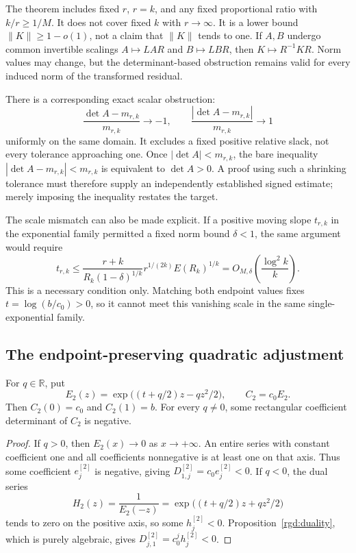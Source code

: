 The theorem includes fixed $r$, $r=k$, and any fixed proportional
ratio with $k/r\ge1/M$.  It does not cover fixed $k$ with $r\to\infty$.
It is a lower bound $\|K\|\ge1-o(1)$, not a claim that $\|K\|$ tends
to one.  If $A,B$ undergo common invertible scalings $A\mapsto LAR$
and $B\mapsto LBR$, then $K\mapsto R^{-1}KR$.  Norm values may change,
but the determinant-based obstruction remains valid for every induced
norm of the transformed residual.

There is a corresponding exact scalar obstruction:
\begin{equation}
 \frac{\det A-m_{r,k}}{m_{r,k}}\longrightarrow-1,
 \qquad
 \frac{|\det A-m_{r,k}|}{m_{r,k}}\longrightarrow1
 \label{rgd:scalar-stop}
\end{equation}
uniformly on the same domain.  It excludes a fixed positive relative
slack, not every tolerance approaching one.  Once $|\det A|<m_{r,k}$,
the bare inequality $|\det A-m_{r,k}|<m_{r,k}$ is equivalent to
$\det A>0$.  A proof using such a shrinking tolerance must therefore
supply an independently established signed estimate; merely imposing
the inequality restates the target.

The scale mismatch can also be made explicit.  If a positive moving
slope $t_{r,k}$ in the exponential family permitted a fixed norm bound
$\delta<1$, the same argument would require
\begin{equation}
 t_{r,k}\le
 \frac{r+k}{R_k(1-\delta)^{1/k}}
       r^{1/(2k)}E(R_k)^{1/k}
 =O_{M,\delta}\!\left(\frac{\log^2 k}{k}\right).
 \label{rgd:moving-slope}
\end{equation}
This is a necessary condition only.  Matching both endpoint values
fixes $t=\log(b/c_0)>0$, so it cannot meet this vanishing scale in the
same single-exponential family.

\subsection{The endpoint-preserving quadratic adjustment}

\begin{proposition}
\label{rgd:quadratic}
For $q\in\mathbb R$, put
\[
 E_2(z)=\exp\bigl((t+q/2)z-qz^2/2\bigr),\qquad C_2=c_0E_2.
\]
Then $C_2(0)=c_0$ and $C_2(1)=b$.  For every $q\ne0$, some
rectangular coefficient determinant of $C_2$ is negative.
\end{proposition}
\begin{proof}
If $q>0$, then $E_2(x)\to0$ as $x\to+\infty$.  An entire series
with constant coefficient one and all coefficients nonnegative is
at least one on that axis.  Thus some coefficient $e_j^{[2]}$ is
negative, giving $D_{1,j}^{[2]}=c_0e_j^{[2]}<0$.
If $q<0$, the dual series
\[
 H_2(z)=\frac1{E_2(-z)}
       =\exp\bigl((t+q/2)z+qz^2/2\bigr)
\]
tends to zero on the positive axis, so some $h_j^{[2]}<0$.
Proposition~\ref{rgd:duality}, which is purely algebraic, gives
$D_{j,1}^{[2]}=c_0^jh_j^{[2]}<0$.
\end{proof}

